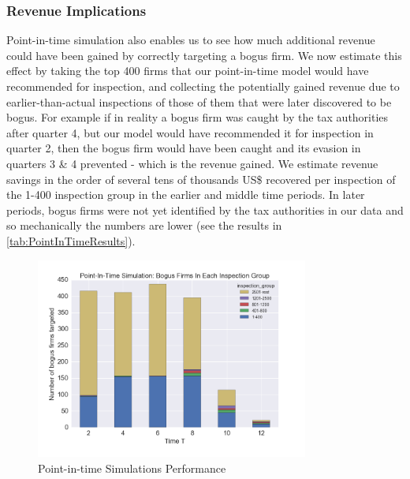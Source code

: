 \subsubsection{Revenue Implications}
\label{subsec:revenue-implications}
Point-in-time simulation also enables us to see how much additional revenue could have been gained by correctly targeting a bogus firm. We now estimate this effect by taking the top 400 firms that our point-in-time model would have recommended for inspection, and collecting the potentially gained revenue due to earlier-than-actual inspections of those of them that were later discovered to be bogus. For example if in reality a bogus firm was caught by the tax authorities after quarter 4, but our model  would have recommended it for inspection in quarter 2, then the bogus firm would have been caught and its evasion in quarters 3 \& 4 prevented - which is the revenue gained. We estimate revenue savings in the order of several tens of thousands US\$ recovered per inspection of the 1-400 inspection group in the earlier and middle time periods. In later periods, bogus firms were not yet identified by the tax authorities in our data and so mechanically the numbers are lower (see the results in \cref{tab:PointInTimeResults}). 

\begin{figure}[t!]
  \includegraphics[width=0.8\textwidth]{graphs/PointInTimePerformanceAggregate.png}
  \caption{Point-in-time Simulations Performance}
  \label{fig:PointInTimePerformanceArea}
 \end{figure}


